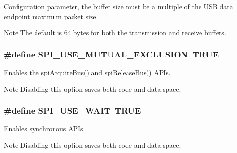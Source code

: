 Configuration parameter, the buffer size must be a multiple of the U\+S\+B data endpoint maximum packet size. \begin{DoxyNote}{Note}
The default is 64 bytes for both the transmission and receive buffers. 
\end{DoxyNote}
\hypertarget{group__HAL__CONF_ga36d1818f9631f955f7cc94629b1d5498}{
\subsubsection[{S\+P\+I\+\_\+\+U\+S\+E\+\_\+\+M\+U\+T\+U\+A\+L\+\_\+\+E\+X\+C\+L\+U\+S\+I\+O\+N}]{\setlength{\rightskip}{0pt plus 5cm}\#define S\+P\+I\+\_\+\+U\+S\+E\+\_\+\+M\+U\+T\+U\+A\+L\+\_\+\+E\+X\+C\+L\+U\+S\+I\+O\+N~T\+R\+U\+E}}\label{group__HAL__CONF_ga36d1818f9631f955f7cc94629b1d5498}


Enables the {\ttfamily spi\+Acquire\+Bus()} and {\ttfamily spi\+Release\+Bus()} A\+P\+Is. 

\begin{DoxyNote}{Note}
Disabling this option saves both code and data space. 
\end{DoxyNote}
\hypertarget{group__HAL__CONF_ga0c9ab1488423fa10a22f506c6e74b563}{
\subsubsection[{S\+P\+I\+\_\+\+U\+S\+E\+\_\+\+W\+A\+I\+T}]{\setlength{\rightskip}{0pt plus 5cm}\#define S\+P\+I\+\_\+\+U\+S\+E\+\_\+\+W\+A\+I\+T~T\+R\+U\+E}}\label{group__HAL__CONF_ga0c9ab1488423fa10a22f506c6e74b563}


Enables synchronous A\+P\+Is. 

\begin{DoxyNote}{Note}
Disabling this option saves both code and data space. 
\end{DoxyNote}
